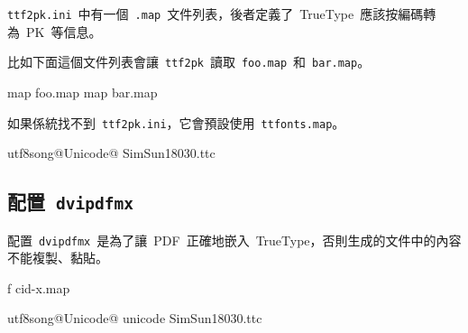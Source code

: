 \verb|ttf2pk.ini|~中有一個~\verb|.map|~文件列表，後者定義了~TrueType~應該按編碼轉為~PK~等信息。

比如下面這個文件列表會讓~\verb|ttf2pk|~讀取~\verb|foo.map|~和~\verb|bar.map|。

\begin{code}
map foo.map
map bar.map
\end{code}

如果係統找不到~\verb|ttf2pk.ini|，它會預設使用~\verb|ttfonts.map|。
\begin{code}
utf8song@Unicode@ SimSun18030.ttc
\end{code}

\subsection{配置~\texttt{dvipdfmx}}
配置~\verb|dvipdfmx|~是為了讓~PDF~正確地嵌入~TrueType，否則生成的文件中的內容不能複製、黏貼。

\begin{code}
f cid-x.map
\end{code}

\begin{code}
utf8song@Unicode@ unicode SimSun18030.ttc
\end{code}



\newpage


